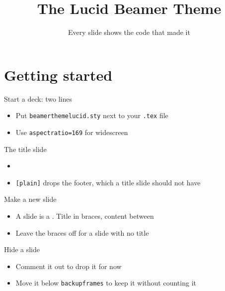 \documentclass[11pt,aspectratio=43]{beamer}
\title{The Lucid Beamer Theme}
\subtitle{Every slide shows the code that made it}
\date{}
\newcommand{\howto}[1]{}
\begin{document}
\begin{frame}[plain]
  \titlepage
\end{frame}

\section{Getting started}

\begin{frame}{Start a deck: two lines}
  \begin{itemize}
    \item Put \texttt{beamerthemelucid.sty} next to your \texttt{.tex} file
  \end{itemize}
  \howto{start}
  \begin{itemize}
    \item Use \texttt{aspectratio=169} for widescreen
  \end{itemize}
\end{frame}

\begin{frame}[allowframebreaks]{The title slide}
  \begin{itemize}
    \item {}
    \item \texttt{[plain]} drops the footer, which a title slide should not have
  \end{itemize}
  \howto{title-slide}
\end{frame}

\begin{frame}[allowframebreaks]{Make a new slide}
  \begin{itemize}
    \item A slide is a . Title in braces, content between
    \item Leave the braces off for a slide with no title
  \end{itemize}
  \howto{new-slide}
\end{frame}

\begin{frame}[allowframebreaks]{Hide a slide}
  \begin{itemize}
    \item Comment it out to drop it for now
    \item Move it below \texttt{backupframes} to keep it without counting it
  \end{itemize}
  \howto{hide-slide}
\end{frame}
\end{document}
